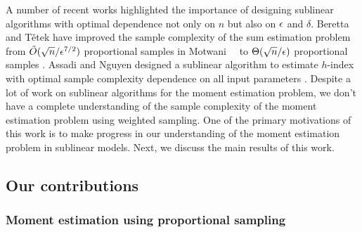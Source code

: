 A number of recent works \cite{AN2022,TT2022,G2017} highlighted the importance of designing sublinear algorithms with optimal dependence not only on $n$ but also on $\epsilon$ and $\delta$. Beretta and T{\v{e}}tek have improved the sample complexity of the sum estimation problem from $\tilde{O}(\sqrt{n}/\epsilon^{7/2})$ proportional samples in Motwani~\etal~\cite{MPX2007} to $\Theta(\sqrt{n}/\epsilon)$ proportional samples \cite{BT2022}. Assadi and Nguyen designed a sublinear algorithm to estimate $h$-index with optimal sample complexity dependence on all input parameters \cite{AN2022}. Despite a lot of work on sublinear algorithms for the moment estimation problem, we don't have a complete understanding of the sample complexity of the moment estimation problem using weighted sampling. One of the primary motivations of this work is to make progress in our understanding of the moment estimation problem in sublinear models. Next, we discuss the main results of this work.


\subsection{Our contributions}


\subsubsection{Moment estimation using proportional sampling} 

